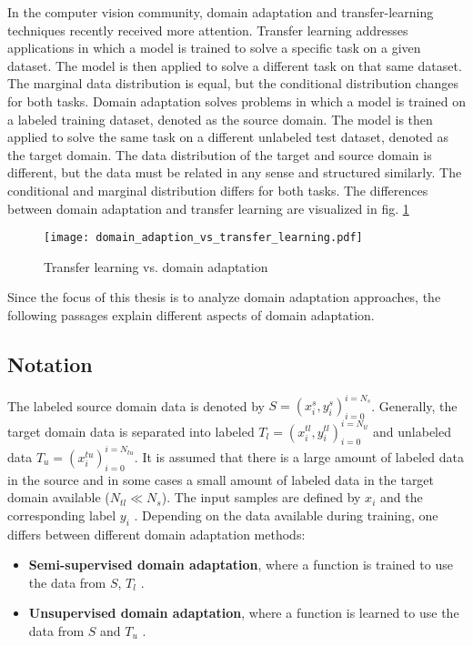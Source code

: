 In the computer vision community, domain adaptation and transfer-learning techniques recently received more attention. Transfer learning addresses applications in which a model is trained to solve a specific task on a given dataset. The model is then applied to solve a different task on that same dataset. The marginal data distribution is equal, but the conditional distribution changes for both tasks. Domain adaptation solves problems in which a model is trained on a labeled training dataset, denoted as the source domain. The model is then applied to solve the same task on a different unlabeled test dataset, denoted as the target domain. The data distribution of the target and source domain is different, but the data must be related in any sense and structured similarly. The conditional and marginal distribution differs for both tasks. The differences between domain adaptation and transfer learning are visualized in fig. \ref{fig:domain_adaption_vs_transfer_learning}

\begin{figure}[H]
  \centering
  \texttt{[image: domain\_adaption\_vs\_transfer\_learning.pdf]}
  \caption {Transfer learning vs. domain adaptation} \label{fig:domain_adaption_vs_transfer_learning}
\end{figure}

Since the focus of this thesis is to analyze domain adaptation approaches, the following passages explain different aspects of domain adaptation.
\subsection{Notation}
The labeled source domain data is denoted by  $S = {(x_{i}^{s}, y_{i}^{s})_{i = 0}^{i = N_{s}}}$. Generally, the target domain data is separated into labeled $T_{l} = {(x_{i}^{tl}, y_{i}^{tl})_{i = 0}^{i = N_{tl}}}$ and unlabeled data $T_{u} = {(x_{i}^{tu})_{i = 0}^{i = N_{tu}}}$. It is assumed that there is a large amount of labeled data in the source and in some cases a small amount of labeled data in the target domain available ($N_{tl} \ll N_{s}$). The input samples are defined by $x_{i}$ and the corresponding label $y_{i}$  \cite{Patel2015}. Depending on the data available during training, one differs between different domain adaptation methods: 
\begin{itemize}
\item \textbf{Semi-supervised domain adaptation}, where a function is trained to use the data from $S$, $T_{l}$ \cite{Patel2015}. 
\item \textbf{Unsupervised domain adaptation}, where a function is learned to use the data from $S$ and $T_{u}$ \cite{Patel2015}.
\end{itemize}

